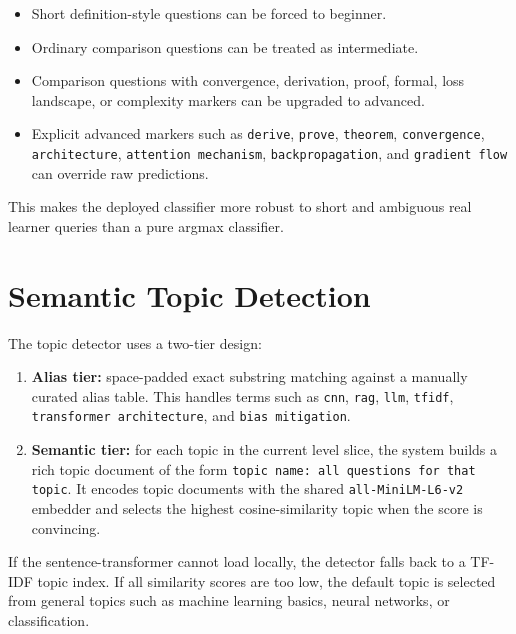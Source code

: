 \documentclass[11pt,a4paper]{article}
\begin{document}
\begin{itemize}
    \item Short definition-style questions can be forced to beginner.
    \item Ordinary comparison questions can be treated as intermediate.
    \item Comparison questions with convergence, derivation, proof, formal, loss landscape, or complexity markers can be upgraded to advanced.
    \item Explicit advanced markers such as \texttt{derive}, \texttt{prove}, \texttt{theorem}, \texttt{convergence}, \texttt{architecture}, \texttt{attention mechanism}, \texttt{backpropagation}, and \texttt{gradient flow} can override raw predictions.
\end{itemize}

This makes the deployed classifier more robust to short and ambiguous real learner queries than a pure argmax classifier.

\section{Semantic Topic Detection}

The topic detector uses a two-tier design:

\begin{enumerate}
    \item \textbf{Alias tier:} space-padded exact substring matching against a manually curated alias table. This handles terms such as \texttt{cnn}, \texttt{rag}, \texttt{llm}, \texttt{tfidf}, \texttt{transformer architecture}, and \texttt{bias mitigation}.
    \item \textbf{Semantic tier:} for each topic in the current level slice, the system builds a rich topic document of the form \texttt{topic name: all questions for that topic}. It encodes topic documents with the shared \texttt{all-MiniLM-L6-v2} embedder and selects the highest cosine-similarity topic when the score is convincing.
\end{enumerate}

If the sentence-transformer cannot load locally, the detector falls back to a TF-IDF topic index. If all similarity scores are too low, the default topic is selected from general topics such as machine learning basics, neural networks, or classification.
\end{document}
